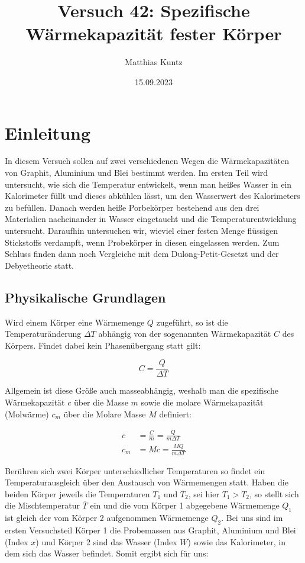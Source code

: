 \documentclass{article}
\title{Versuch 42: Spezifische Wärmekapazität fester Körper}
\author{Matthias Kuntz}
\date{15.09.2023}
\begin{document}
\maketitle

\section{Einleitung}

In diesem Versuch sollen auf zwei verschiedenen Wegen die Wärmekapazitäten von Graphit, Aluminium und Blei bestimmt werden. Im ersten Teil wird untersucht, wie sich die Temperatur entwickelt, wenn man heißes Wasser in ein Kalorimeter füllt und dieses abkühlen lässt, um den Wasserwert des Kalorimeters zu befüllen. Danach werden heiße Porbekörper bestehend aus den drei Materialien nacheinander in Wasser eingetaucht und die Temperaturentwicklung untersucht. Daraufhin untersuchen wir, wieviel einer festen Menge flüssigen Stickstoffs verdampft, wenn Probekörper in diesen eingelassen werden. Zum Schluss finden dann noch Vergleiche mit dem Dulong-Petit-Gesetzt und der Debyetheorie statt. 

\subsection{Physikalische Grundlagen}

Wird einem Körper eine Wärmemenge $Q$ zugeführt, so ist die Temperaturänderung $\Delta T$ abhängig von der sogenannten Wärmekapazität $C$ des Körpers. Findet dabei kein Phasenübergang statt gilt:

\begin{equation}
    C=\frac{Q}{\Delta T}
\end{equation}

Allgemein ist diese Größe auch masseabhängig, weshalb man die spezifische Wärmekapazität $c$ über die Masse $m$ sowie die molare Wärmekapazität (Molwärme) $c_m$ über die Molare Masse $M$ definiert:

\begin{equation}
    \begin{split}
        c &= \frac{C}{m} = \frac{Q}{m \Delta T} \\
        c_m &= M c = \frac{MQ}{m \Delta T}
    \end{split}
\end{equation}

Berühren sich zwei Körper unterschiedlicher Temperaturen so findet ein Temperaturausgleich über den Austausch von Wärmemengen statt. Haben die beiden Körper jeweils die Temperaturen $T_1$ und $T_2$, sei hier $T_1 > T_2$, so stellt sich die Mischtemperatur $\overline{T}$ ein und die vom Körper 1 abgegebene Wärmemenge $Q_1$ ist gleich der vom Körper 2 aufgenommen Wärmemenge $Q_2$. Bei uns sind im ersten Versuchsteil Körper 1 die Probemassen aus Graphit, Aluminium und Blei (Index $x$) und Körper 2 sind das Wasser (Index $W$) sowie das Kalorimeter, in dem sich das Wasser befindet. Somit ergibt sich für uns:
\end{document}
